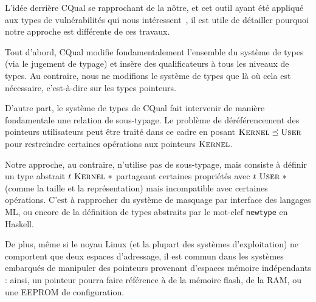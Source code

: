 L'idée derrière CQual se rapprochant de la nôtre, et cet outil ayant été
appliqué aux types de vulnérabilités qui nous intéressent~\cite{cquk-usenix04},
il est utile de détailler pourquoi notre approche est différente de ces travaux.

Tout d'abord, CQual modifie fondamentalement l'ensemble du système de types (via
le jugement de typage) et insère des qualificateurs à tous les niveaux de types.
Au contraire, nous ne modifions le système de types que là où cela est
nécessaire, c'est-à-dire sur les types pointeurs.

D'autre part, le système de types de CQual fait intervenir de manière
fondamentale une relation de sous-typage. Le problème de déréférencement des
pointeurs utilisateurs peut être traité dans ce cadre en posant $\textsc{Kernel}
\preceq \textsc{User}$ pour restreindre certaines opérations aux pointeurs $\textsc{Kernel}$.

Notre approche, au contraire, n'utilise pas de sous-typage, mais consiste à
définir un type abstrait $t~\textsc{Kernel}~*$ partageant certaines propriétés avec
$t~\textsc{User}~*$ (comme la taille et la représentation) mais incompatible avec
certaines opérations. C'est à rapprocher du système de masquage par interface
des langages ML, ou encore de la définition de types abstraits par le mot-clef
\texttt{newtype} en Haskell.

De plus, même si le noyau Linux (et la plupart des systèmes d'exploitation) ne
comportent que deux espaces d'adressage, il est commun dans les systèmes
embarqués de manipuler des pointeurs provenant d'espaces mémoire indépendants :
ainsi, un pointeur pourra faire référence à de la mémoire flash, de la RAM, ou
une EEPROM de configuration.

\wip
